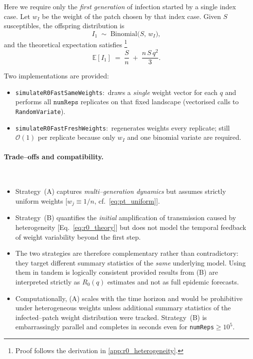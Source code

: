 \noindent
Here we require only the \emph{first generation} of infection started by a single index case.  Let $w_I$ be the weight of the patch chosen by that index case. Given $S$ susceptibles, the offspring distribution is
\begin{equation}
  I_1 \;\sim\; \text{Binomial}\!\bigl(S,\,w_I\bigr),
  \label{eq:binom_firstgen}
\end{equation}
and the theoretical expectation satisfies%
\footnote{%
Proof follows the derivation in \cref{app:r0_heterogeneity}.}
\begin{equation}
  \mathbb E[I_1]
  \;=\;
  \frac{S}{n}
  \;+\;
  \frac{n\,S\,q^{2}}{3}.
  \label{eq:r0_theory}
\end{equation}

Two implementations are provided:

\begin{itemize}
\item
\texttt{\color{blue}simulateR0FastSameWeights}:\ draws a \emph{single} weight vector for each $q$ and performs all $\texttt{numReps}$ replicates on that fixed landscape (vectorised calls to \texttt{RandomVariate}).
\item
\texttt{\color{blue}simulateR0FastFreshWeights}:\ regenerates weights every replicate; still $\mathcal O(1)$ per replicate because only $w_I$ and one binomial variate are required.
\end{itemize}

\paragraph{Trade–offs and compatibility.}\mbox{}\\

\begin{itemize}
\item  Strategy~(A) captures \emph{multi–generation dynamics}
      but assumes strictly uniform weights
      [$w_j\equiv 1/n$, cf.\ \eqref{eq:pt_uniform}].
\item  Strategy~(B) quantifies the \emph{initial} amplification of
      transmission caused by heterogeneity
      [Eq.~\eqref{eq:r0_theory}] but does not model the temporal feedback
      of weight variability beyond the first step.
\item  The two strategies are therefore complementary rather than
      contradictory: they target different summary statistics of the
      \emph{same} underlying model. Using them in tandem is logically
      consistent provided results from (B) are interpreted strictly as
      $R_0(q)$ estimates and not as full epidemic forecasts.
\item  Computationally, (A) scales with the time horizon and would be
      prohibitive under heterogeneous weights unless additional summary
      statistics of the infected–patch weight distribution were tracked.
      Strategy~(B) is embarrassingly parallel and completes in
      seconds even for \texttt{numReps}$\ge 10^{5}$.
\end{itemize}

